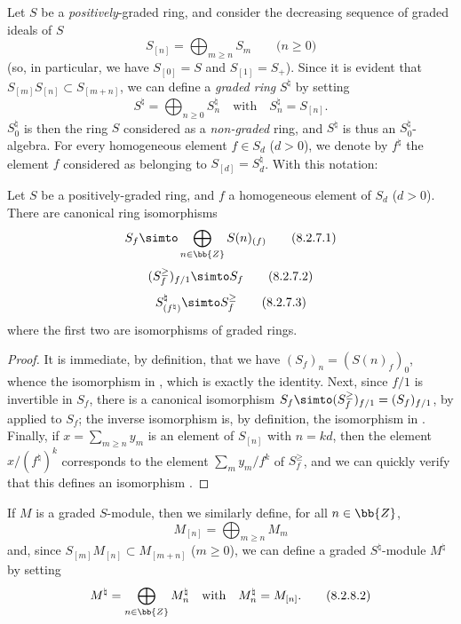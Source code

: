 \begin{env}[8.2.6]
\label{II.8.2.6}
Let $S$ be a \emph{positively}-graded ring, and consider the decreasing sequence of graded ideals of $S$
\[
\label{II.8.2.6.1}
  S_{[n]} = \bigoplus_{m\geq n} S_m
  \qquad\mbox{($n\geq0$)}
\tag{8.2.6.1}
\]
(so, in particular, we have $S_{[0]}=S$ and $S_{[1]}=S_+$).
Since it is evident that $S_{[m]}S_{[n]} \subset S_{[m+n]}$, we can define a \emph{graded ring} $S^\natural$ by setting
\[
\label{II.8.2.6.2}
  S^\natural = \bigoplus_{n\geq0} S_n^\natural
  \quad
  \text{with}
  \quad
  S_n^\natural = S_{[n]}.
\tag{8.2.6.2}
\]
$S_0^\natural$ is then the ring $S$ considered as a \emph{non-graded} ring, and $S^\natural$ is thus an $S_0^\natural$-algebra.
For every homogeneous element $f\in S_d$ ($d>0$), we denote by $f^\natural$ the element $f$ considered as belonging to $S_{[d]} = S_d^\natural$.
With this notation:
\end{env}

\begin{lemma}[8.2.7]
\label{II.8.2.7}
Let $S$ be a positively-graded ring, and $f$ a homogeneous element of $S_d$ ($d>0$).
There are canonical ring isomorphisms
\[
\label{II.8.2.7.1}
  S_f \simto \bigoplus_{n\in\bb{Z}} S(n)_{(f)}
\tag{8.2.7.1}
\]
\[
\label{II.8.2.7.2}
  (S_f^\geq)_{f/1} \simto S_f
\tag{8.2.7.2}
\]
\[
\label{II.8.2.7.3}
  S_{(f^\natural)}^\natural \simto S_f^\geq
\tag{8.2.7.3}
\]
where the first two are isomorphisms of graded rings.
\end{lemma}

\begin{proof}
It is immediate, by definition, that we have $(S_f)_n = (S(n)_f)_0$, whence the isomorphism in , which is exactly the identity.
Next, since $f/1$ is invertible in $S_f$, there is a canonical isomorphism $S_f \simto (S_f^\geq)_{f/1} = (S_f)_{f/1}$, by  applied to $S_f$;
the inverse isomorphism is, by definition, the isomorphism in .
Finally, if $x = \sum_{m\geq n}y_m$ is an element of $S_{[n]}$ with $n=kd$, then the element $x/(f^\natural)^k$ corresponds to the element $\sum_m y_m/f^k$ of $S_f^\geq$, and we can quickly verify that this defines an isomorphism .
\end{proof}

\begin{env}[8.2.8]
\label{II.8.2.8}
If $M$ is a graded $S$-module, then we similarly define, for all $n\in\bb{Z}$,
\[
\label{II.8.2.8.1}
  M_{[n]} = \bigoplus_{m\geq n} M_m
\tag{8.2.8.1}
\]
and, since $S_{[m]}M_{[n]} \subset M_{[m+n]}$ ($m\geq0$), we can define a graded $S^\natural$-module $M^\natural$ by setting
\[
\label{II.8.2.8.2}
  M^\natural = \bigoplus_{n\in\bb{Z}} M_n^\natural
  \quad
  \text{with}
  \quad
  M_n^\natural = M_{[n]}.
\tag{8.2.8.2}
\]
\end{env}

